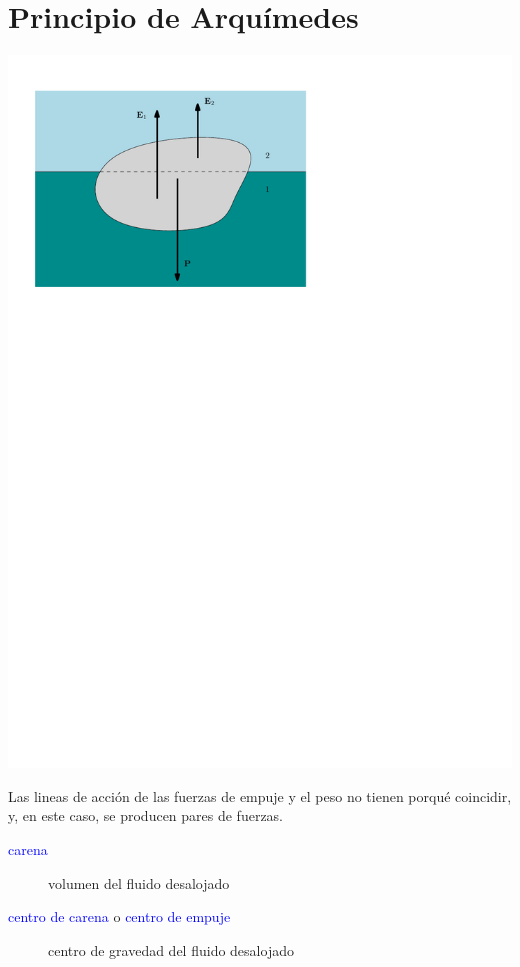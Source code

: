 \section{Principio de Arquímedes}



\begin{minipage}{0.4\textwidth}
	\begin{center}
		\includegraphics[width=\textwidth]{TeX_files/chapter02-Hidrostatica/arquimedes}
	\end{center}
\end{minipage}
\begin{minipage}{0.5\textwidth}
	Las lineas de acci\'on de las fuerzas de empuje y el peso no
	tienen porqu\'e coincidir, y, en este caso, se producen pares de fuerzas.
	\begin{description}
		\item[\textcolor{blue}{carena}] volumen del fluido desalojado
		\item[\textcolor{blue}{centro
			de carena} o \textcolor{blue}{centro de empuje}] centro de gravedad del fluido desalojado
	\end{description}
\end{minipage}


